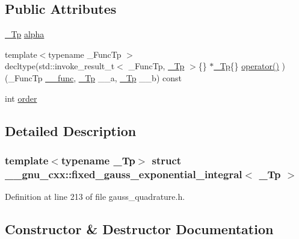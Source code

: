 \subsection*{Public Attributes}
\begin{DoxyCompactItemize}
\item 
\hyperlink{namespace____gnu__cxx_a3b19a9c800ca194374ef9172290f7d79}{\+\_\+\+Tp} \hyperlink{struct____gnu__cxx_1_1fixed__gauss__exponential__integral_a44760dd8147de2cdaa7a0817b9f10202}{alpha}
\item 
{\footnotesize template$<$typename \+\_\+\+Func\+Tp $>$ }\\decltype(std\+::invoke\+\_\+result\+\_\+t$<$ \+\_\+\+Func\+Tp, \hyperlink{namespace____gnu__cxx_a3b19a9c800ca194374ef9172290f7d79}{\+\_\+\+Tp} $>$\{\} $\ast$\hyperlink{namespace____gnu__cxx_a3b19a9c800ca194374ef9172290f7d79}{\+\_\+\+Tp}\{\} \hyperlink{struct____gnu__cxx_1_1fixed__gauss__exponential__integral_afe5fe800ebaaf8e6a97034a6c4a17b1e}{operator()} )(\+\_\+\+Func\+Tp \hyperlink{namespace____gnu__cxx_af2b2f0c7a2ae72b922b1afefae5a65b2}{\+\_\+\+\_\+func}, \hyperlink{namespace____gnu__cxx_a3b19a9c800ca194374ef9172290f7d79}{\+\_\+\+Tp} \+\_\+\+\_\+a, \hyperlink{namespace____gnu__cxx_a3b19a9c800ca194374ef9172290f7d79}{\+\_\+\+Tp} \+\_\+\+\_\+b) const
\item 
int \hyperlink{struct____gnu__cxx_1_1fixed__gauss__exponential__integral_a2b72985cb9d78eab9a969e304affcc1c}{order}
\end{DoxyCompactItemize}


\subsection{Detailed Description}
\subsubsection*{template$<$typename \+\_\+\+Tp$>$\newline
struct \+\_\+\+\_\+gnu\+\_\+cxx\+::fixed\+\_\+gauss\+\_\+exponential\+\_\+integral$<$ \+\_\+\+Tp $>$}



Definition at line 213 of file gauss\+\_\+quadrature.\+h.



\subsection{Constructor \& Destructor Documentation}
\mbox{\label{struct____gnu__cxx_1_1fixed__gauss__exponential__integral_a6ea4877ba4237e76210f194531edfa8e}} 
